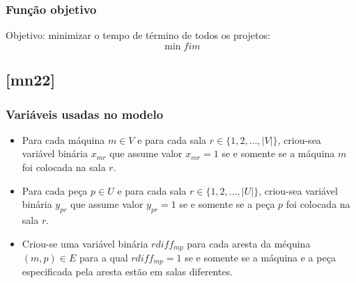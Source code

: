 \documentclass[11pt,letterpaper]{article}
\begin{document}
\subsubsection*{Função objetivo}
Objetivo: minimizar o tempo de término de todos os projetos:
\begin{equation}
\min fim
\end{equation}


\subsection{{[}mn22{]}}
\subsubsection*{Variáveis usadas no modelo}
\begin{itemize}
\item Para cada máquina $m \in V$ e para cada sala $r \in
  \{1,2,...,|V|\}$, criou-sea variável binária $x_{mr}$ que assume valor
  $x_{mr}=1$ se e somente se  a máquina $m$
  foi colocada na sala $r$.


\item Para cada peça $p \in U$ e para cada sala $r \in
  \{1,2,...,|U|\}$, criou-sea variável binária $y_{pr}$ que assume valor
  $y_{pr}=1$ se e somente se a peça $p$  foi colocada na sala $r$.

\item Criou-se uma variável binária $rdiff_{mp}$ para
  cada aresta da méquina $(m,p) \in  E$ para a qual
  $rdiff_{mp}=1$ se e somente se a máquina e a peça especificada pela aresta estão em salas diferentes.

\end{itemize}
\end{document}
